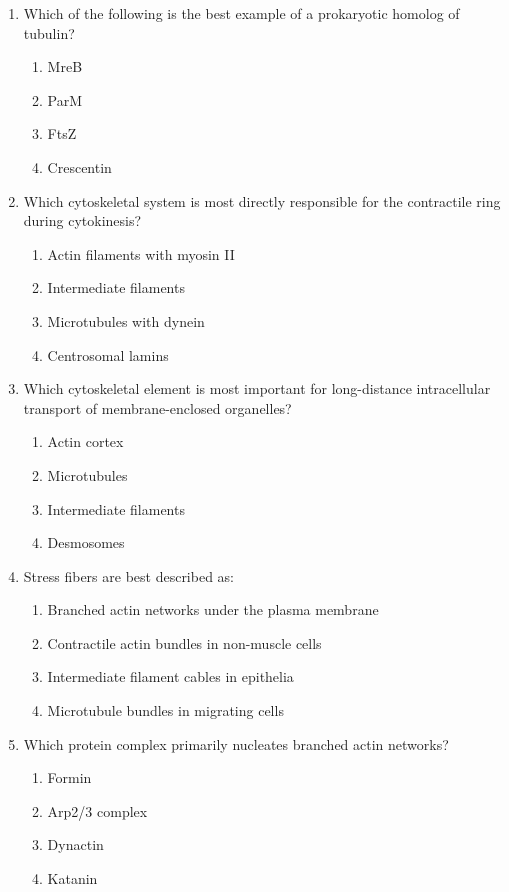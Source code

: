\documentclass[12pt,fontset=none]{ctexart}
\begin{document}
\begin{enumerate}
\item Which of the following is the best example of a prokaryotic homolog of tubulin?
\begin{enumerate}[label=\alph*.]
\item MreB
\item ParM
\item FtsZ
\item Crescentin
\end{enumerate}

\item Which cytoskeletal system is most directly responsible for the contractile ring during cytokinesis?
\begin{enumerate}[label=\alph*.]
\item Actin filaments with myosin II
\item Intermediate filaments
\item Microtubules with dynein
\item Centrosomal lamins
\end{enumerate}

\item Which cytoskeletal element is most important for long-distance intracellular transport of membrane-enclosed organelles?
\begin{enumerate}[label=\alph*.]
\item Actin cortex
\item Microtubules
\item Intermediate filaments
\item Desmosomes
\end{enumerate}

\item Stress fibers are best described as:
\begin{enumerate}[label=\alph*.]
\item Branched actin networks under the plasma membrane
\item Contractile actin bundles in non-muscle cells
\item Intermediate filament cables in epithelia
\item Microtubule bundles in migrating cells
\end{enumerate}

\item Which protein complex primarily nucleates branched actin networks?
\begin{enumerate}[label=\alph*.]
\item Formin
\item Arp2/3 complex
\item Dynactin
\item Katanin
\end{enumerate}


\end{enumerate}
\end{document}
